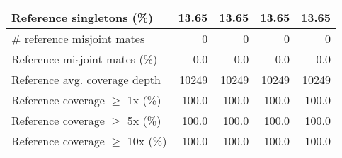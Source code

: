 \documentclass[12pt,a4paper]{article}
\begin{document}
\begin{table}[ht]
\begin{center}
\begin{tabular}{|l*{4}{|r}|}
Reference singletons (\%) & 13.65 & 13.65 & 13.65 & 13.65 \\ \hline
\# reference misjoint mates & 0 & 0 & 0 & 0 \\ \hline
Reference misjoint mates (\%) & 0.0 & 0.0 & 0.0 & 0.0 \\ \hline
Reference avg. coverage depth & 10249 & 10249 & 10249 & 10249 \\ \hline
Reference coverage $\geq$ 1x (\%) & 100.0 & 100.0 & 100.0 & 100.0 \\ \hline
Reference coverage $\geq$ 5x (\%) & 100.0 & 100.0 & 100.0 & 100.0 \\ \hline
Reference coverage $\geq$ 10x (\%) & 100.0 & 100.0 & 100.0 & 100.0 \\ \hline
\end{tabular}
\end{center}
\end{table}
\end{document}
